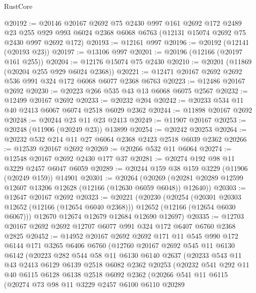 \begin{lexlean}{RustCore}
\begin{coremodule}
@20192 := @20146
    @20167
    @2692
    @75
    @2430
    @997
    @161
    @2692
    @172
    @2489
    @23
    @255
    @929
    @993
    @6024
    @2368
    @6068
    @6763
    (@12131 @15074 @2692 @75 @2430 @997 @2692 @172)
@20193 := @12161 @997
@20196 := @20192 (@12141 (@20193 @23))
@20197 := @13106 @997
@20201 := @20196 (@12166 (@20197 @161 @255))
@20204 := @12176 @15074 @75 @2430
@20210 := @20201 (@11869 (@20204 @255 @929 @6024 @2368))
@20221 := @12471 @20167 @2692 @2692 @536 @991 @324 @172 @6068 @6077 @2368 @6763
@20223 := @12486 @20167 @2692
@20230 := @20223 @266 @535 @43 @13 @6068 @6075 @2567
@20232 := @12499 @20167 @2692
@20233 := @20232 @204
@20242 := @20233 @534 @11 @40 @2413 @6067 @6074 @2518 @6029 @2362
@20244 := @11898 @20167 @2692
@20248 := @20244 @23 @11 @23 @2413
@20249 := @11907 @20167
@20253 := @20248 (@11906 (@20249 @23)) @13899
@20254 := @20242 @20253
@20264 := @20232 @532 @214 @11 @27 @6064 @2368 @2423 @2518 @6039 @2362
@20266 := @12539 @20167 @2692
@20269 := @20266 @532 @11 @6064
@20274 := @12548 @20167 @2692 @2430 @177 @37
@20281 := @20274 @192 @98 @11 @3229 @2457 @6047 @6059
@20289 := @20244 @159 @38 @159 @3229 (@11906 (@20249 @159)) @14901
@20301 := @20264
    (@20269 (@20281 @20289 @12599 @12607 @13206 @12628 (@12166 (@12630 @6059 @6048)) @12640))
@20303 := @12647 @20167 @2692
@20323 := @20221
    (@20230
      (@20254
        (@20301 @20303 @12652 (@12166 (@12654 @6040 @2368)))
        @12652
        (@12166 (@12654 @6030 @6067)))
      @12670
      @12674
      @12679
      @12684
      @12690
      @12697)
@20335 := @12703 @20167 @2692 @2692 @12707 @6077 @991 @324 @172 @6407 @6760 @2368 @2825
@20452 := @14952
    @20167
    @2692
    @2692
    @171
    @11
    @545
    @990
    @172
    @6144
    @171
    @3265
    @6406
    @6760
    (@12760
      @20167
      @2692
      @545
      @11
      @6130
      @6142
      (@20223
        @282
        @544
        @58
        @11
        @6130
        @6140
        @2637
        (@20233
          @543
          @11
          @43
          @2413
          @6129
          @6139
          @2518
          @6082
          @2362
          @20253
          (@20232
            @541
            @292
            @11
            @40
            @6115
            @6128
            @6138
            @2518
            @6092
            @2362
            (@20266
              @541
              @11
              @6115
              (@20274
                @73
                @98
                @11
                @3229
                @2457
                @6100
                @6110
                @20289

\end{coremodule}
\end{lexlean}
